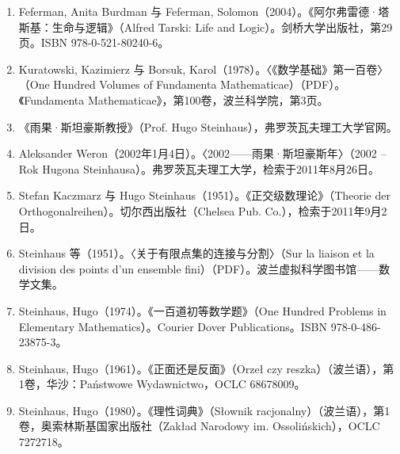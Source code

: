 \begin{enumerate}
  \item Feferman, Anita Burdman 与 Feferman, Solomon（2004）。《阿尔弗雷德·塔斯基：生命与逻辑》（Alfred Tarski: Life and Logic）。剑桥大学出版社，第29页。ISBN 978-0-521-80240-6。
  \item Kuratowski, Kazimierz 与 Borsuk, Karol（1978）。〈《数学基础》第一百卷〉（One Hundred Volumes of Fundamenta Mathematicae）（PDF）。《Fundamenta Mathematicae》，第100卷，波兰科学院，第3页。
  \item 《雨果·斯坦豪斯教授》（Prof. Hugo Steinhaus），弗罗茨瓦夫理工大学官网。
  \item Aleksander Weron（2002年1月4日）。〈2002——雨果·斯坦豪斯年〉（2002 – Rok Hugona Steinhausa）。弗罗茨瓦夫理工大学，检索于2011年8月26日。
  \item Stefan Kaczmarz 与 Hugo Steinhaus（1951）。《正交级数理论》（Theorie der Orthogonalreihen）。切尔西出版社（Chelsea Pub. Co.），检索于2011年9月2日。
  \item Steinhaus 等（1951）。〈关于有限点集的连接与分割〉（Sur la liaison et la division des points d'un ensemble fini）（PDF）。波兰虚拟科学图书馆——数学文集。
  \item Steinhaus, Hugo（1974）。《一百道初等数学题》（One Hundred Problems in Elementary Mathematics）。Courier Dover Publications。ISBN 978-0-486-23875-3。
  \item Steinhaus, Hugo（1961）。《正面还是反面》（Orzeł czy reszka）（波兰语），第1卷，华沙：Państwowe Wydawnictwo，OCLC 68678009。
  \item Steinhaus, Hugo（1980）。《理性词典》（Słownik racjonalny）（波兰语），第1卷，奥索林斯基国家出版社（Zakład Narodowy im. Ossolińskich），OCLC 7272718。
\end{enumerate}

